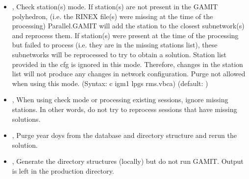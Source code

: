 \documentclass[letterpaper,10pt,english]{sphinxmanual}
\begin{document}
\begin{itemize}
\item {} 
\sphinxAtStartPar
{\hyperref[\detokenize{pgamit.com:ParallelGamit.py--c}]{}} , {\hyperref[\detokenize{pgamit.com:ParallelGamit.py---check_mode}]{}}  \sphinxhyphen{} Check station(s) mode. If station(s) are not present in the GAMIT polyhedron, (i.e. the RINEX file(s) were missing at the time of the processing) Parallel.GAMIT will add the station to the closest subnetwork(s) and reprocess them. If station(s) were present at the time of the processing but failed to process (i.e. they are in the missing stations list), these subnetworks will be reprocessed to try to obtain a solution. Station list provided in the cfg is ignored in this mode. Therefore, changes in the station list will not produce any changes in network configuration. Purge not allowed when using this mode. (Syntax: \sphinxhyphen{}c igm1 lpgs rms.vbca) (default: )

\item {} 
\sphinxAtStartPar
{\hyperref[\detokenize{pgamit.com:ParallelGamit.py--i}]{}}, {\hyperref[\detokenize{pgamit.com:ParallelGamit.py---ignore_missing}]{}} \sphinxhyphen{} When using check mode or processing existing sessions, ignore missing stations. In other words, do not try to reprocess sessions that have missing solutions.

\item {} 
\sphinxAtStartPar
{\hyperref[\detokenize{pgamit.com:ParallelGamit.py--p}]{}}, {\hyperref[\detokenize{pgamit.com:ParallelGamit.py---purge}]{}} \sphinxhyphen{} Purge year doys from the database and directory structure and re\sphinxhyphen{}run the solution.

\item {} 
\sphinxAtStartPar
{\hyperref[\detokenize{pgamit.com:ParallelGamit.py--dry}]{}}, {\hyperref[\detokenize{pgamit.com:ParallelGamit.py---dry_run}]{}} \sphinxhyphen{} Generate the directory structures (locally) but do not run GAMIT. Output is left in the production directory.


\end{itemize}
\end{document}

